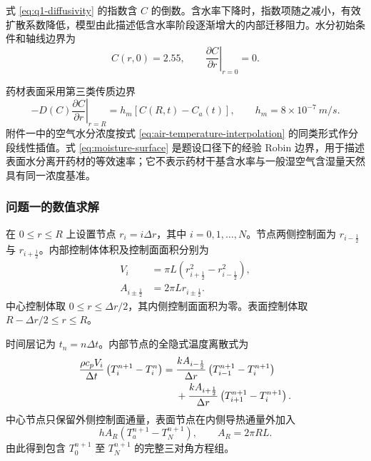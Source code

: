 \documentclass[withoutpreface,bwprint]{cumcmthesis}
\begin{document}
式 \ref{eq:q1-diffusivity} 的指数含 \(C\) 的倒数。含水率下降时，指数项随之减小，有效扩散系数降低，模型由此描述低含水率阶段逐渐增大的内部迁移阻力。水分初始条件和轴线边界为
\begin{equation}
C(r,0)=2.55,\qquad
\left.\frac{\partial C}{\partial r}\right|_{r=0}=0.
\label{eq:moisture-initial-center}
\end{equation}

药材表面采用第三类传质边界
\begin{equation}
-D(C)\left.\frac{\partial C}{\partial r}\right|_{r=R}
=h_m\left[C(R,t)-C_a(t)\right],
\qquad h_m=8\times10^{-7}\ \si{m/s}.
\label{eq:moisture-surface}
\end{equation}
附件一中的空气水分浓度按式 \ref{eq:air-temperature-interpolation} 的同类形式作分段线性插值。式 \ref{eq:moisture-surface} 是题设口径下的经验 Robin 边界，用于描述表面水分离开药材的等效速率；它不表示药材干基含水率与一般湿空气含湿量天然具有同一浓度基准。

\subsubsection{问题一的数值求解}

在 \(0\leq r\leq R\) 上设置节点 \(r_i=i\Delta r\)，其中 \(i=0,1,\ldots,N\)。节点两侧控制面为 \(r_{i-\frac12}\) 与 \(r_{i+\frac12}\)。内部控制体体积及控制面面积分别为
\begin{align}
V_i&=\pi L
\left(
r_{i+\frac12}^{2}-r_{i-\frac12}^{2}
\right),\\
A_{i\pm\frac12}&=2\pi Lr_{i\pm\frac12}.
\label{eq:fvm-geometry}
\end{align}
中心控制体取 \(0\leq r\leq \Delta r/2\)，其内侧控制面面积为零。表面控制体取 \(R-\Delta r/2\leq r\leq R\)。

时间层记为 \(t_n=n\Delta t\)。内部节点的全隐式温度离散式为
\begin{align}
\frac{\rho c_pV_i}{\Delta t}
\left(T_i^{n+1}-T_i^n\right)
={}&
\frac{kA_{i-\frac12}}{\Delta r}
\left(T_{i-1}^{n+1}-T_i^{n+1}\right)\notag\\
&+
\frac{kA_{i+\frac12}}{\Delta r}
\left(T_{i+1}^{n+1}-T_i^{n+1}\right).
\label{eq:heat-fvm}
\end{align}
中心节点只保留外侧控制面通量，表面节点在内侧导热通量外加入
\begin{equation}
hA_R\left(T_a^{n+1}-T_N^{n+1}\right),
\qquad A_R=2\pi RL.
\label{eq:surface-heat-flux}
\end{equation}
由此得到包含 \(T_0^{n+1}\) 至 \(T_N^{n+1}\) 的完整三对角方程组。
\end{document}
